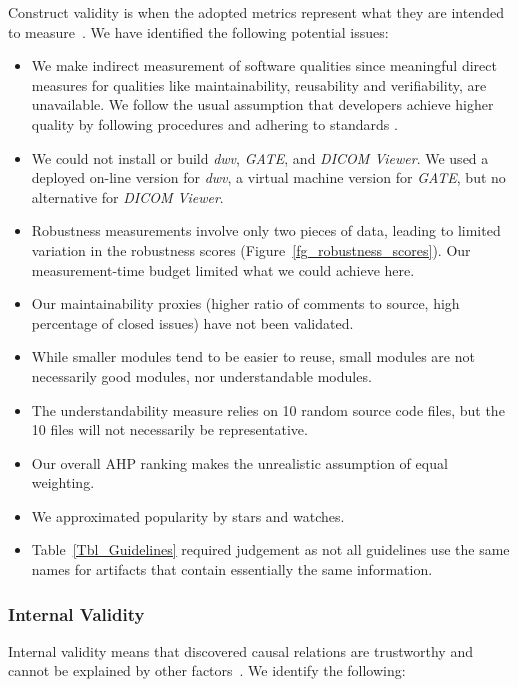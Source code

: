 \documentclass[final, 12pt, 3p, times]{elsarticle}
\begin{document}
Construct validity is when the adopted metrics represent what they are intended
to measure~\cite{RunesonAndHost2009}. We have identified the following
potential issues:
\begin{itemize}
\item We make indirect measurement of software qualities since meaningful direct
measures for qualities like maintainability, reusability and verifiability, are
unavailable.  We follow the usual assumption that developers achieve higher
quality by following procedures and adhering to standards \cite[p.\
112]{VanVliet2000}.
\item We could not install or build \textit{dwv}, \textit{GATE}, and
\textit{DICOM Viewer}. We used a deployed on-line version for \textit{dwv}, a
virtual machine version for \textit{GATE}, but no alternative for \textit{DICOM
Viewer}.
\item Robustness measurements involve only two pieces of data, leading
to limited variation in the robustness scores
(Figure~\ref{fg_robustness_scores}). Our measurement-time budget limited
what we could achieve here.
\item Our maintainability proxies (higher ratio of comments to source,
high percentage of closed issues) have not been validated.
\item While smaller modules tend to be easier to reuse, small modules are
not necessarily good modules, nor understandable modules.
\item The understandability measure relies on 10 random source code files, but
the 10 files will not necessarily be representative. 
\item Our overall AHP ranking makes the unrealistic assumption of equal
weighting.
\item We approximated popularity by stars and watches.
\item Table~\ref{Tbl_Guidelines} required judgement as
not all guidelines use the same names for artifacts that contain
essentially the same information.
\end{itemize}

\subsubsection{Internal Validity} \label{Sec_InternalValidity}

Internal validity means that discovered causal relations are trustworthy and
cannot be explained by other factors~\cite{RunesonAndHost2009}. We identify
the following:
\end{document}
